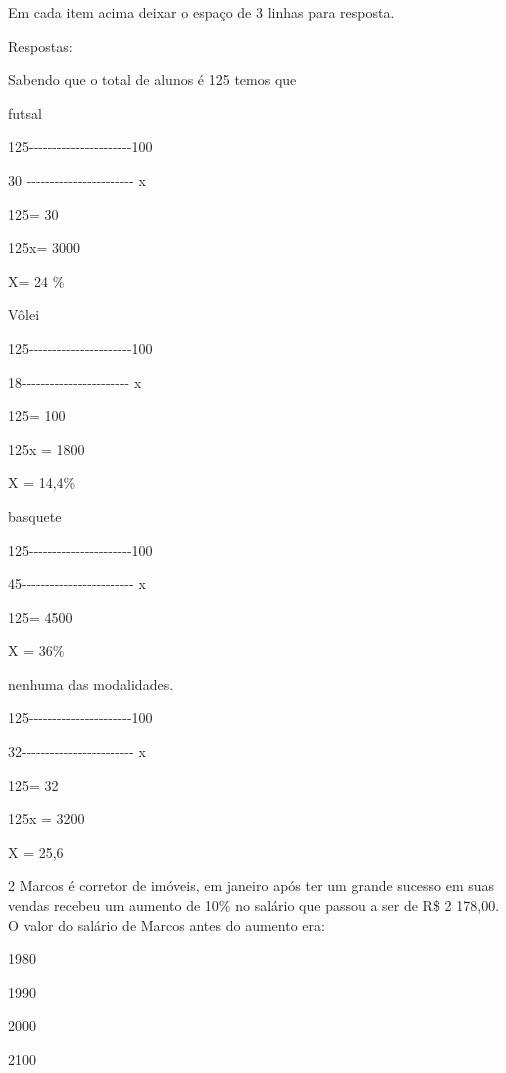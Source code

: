 Em cada item acima deixar o espaço de 3 linhas para resposta.

Respostas:

Sabendo que o total de alunos é 125 temos que

\item futsal

125-\/-\/-\/-\/-\/-\/-\/-\/-\/-\/-\/-\/-\/-\/-\/-\/-\/-\/-\/-\/-\/-100

30 -\/-\/-\/-\/-\/-\/-\/-\/-\/-\/-\/-\/-\/-\/-\/-\/-\/-\/-\/-\/-\/-\/- x

125\times \times = 30

125x= 3000

X= 24 \%

\item Vôlei

125-\/-\/-\/-\/-\/-\/-\/-\/-\/-\/-\/-\/-\/-\/-\/-\/-\/-\/-\/-\/-\/-100

18-\/-\/-\/-\/-\/-\/-\/-\/-\/-\/-\/-\/-\/-\/-\/-\/-\/-\/-\/-\/-\/-\/- x

125\times \times = 100

125x = 1800

X = 14,4\%

\item basquete

125-\/-\/-\/-\/-\/-\/-\/-\/-\/-\/-\/-\/-\/-\/-\/-\/-\/-\/-\/-\/-\/-100

45-\/-\/-\/-\/-\/-\/-\/-\/-\/-\/-\/-\/-\/-\/-\/-\/-\/-\/-\/-\/-\/-\/-\/-
x

125\times = 4500

X = 36\%

\item nenhuma das modalidades.

125-\/-\/-\/-\/-\/-\/-\/-\/-\/-\/-\/-\/-\/-\/-\/-\/-\/-\/-\/-\/-\/-100

32-\/-\/-\/-\/-\/-\/-\/-\/-\/-\/-\/-\/-\/-\/-\/-\/-\/-\/-\/-\/-\/-\/-\/-
x

125\times \times = 32

125x = 3200

X = 25,6

\num{2} Marcos é corretor de imóveis, em janeiro após ter um grande sucesso
em suas vendas recebeu um aumento de 10\% no salário que passou a ser de
R\$ 2 178,00. O valor do salário de Marcos antes do aumento era:

\item 1980
\item 1990
\item 2000
\item 2100

